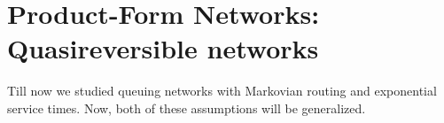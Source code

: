 \documentclass[all-lectures.tex]{subfiles}
\begin{document}

\setcounter{section}{3}
\setcounter{subsection}{0}

\section*{}
\chr
\section{Product-Form Networks: Quasireversible networks}
Till now we studied queuing networks with Markovian routing and exponential service times.  Now, both of these assumptions will be generalized. 
\end{document}
